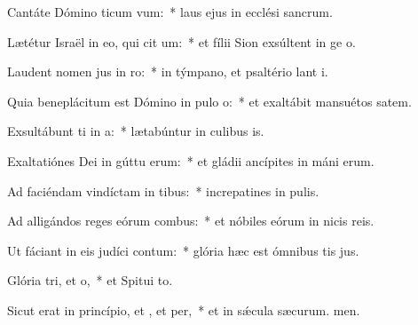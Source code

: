 \item Cantáte Dómino ticum vum:~* laus ejus in ecclési sancrum.
\item Lætétur Israël in eo, qui cit um:~* et fílii Sion exsúltent in ge o.
\item Laudent nomen jus in ro:~* in týmpano, et psaltério lant i.
\item Quia beneplácitum est Dómino in pulo o:~* et exaltábit mansuétos  satem.
\item Exsultábunt ti in a:~* lætabúntur in culibus is.
\item Exaltatiónes Dei in gúttu erum:~* et gládii ancípites in máni erum.
\item Ad faciéndam vindíctam in tibus:~* increpatines in pulis.
\item Ad alligándos reges eórum  combus:~* et nóbiles eórum in nicis reis.
\item Ut fáciant in eis judíci contum:~* glória hæc est ómnibus tis jus.
\item Glória tri, et o,~* et Spitui to.
\item Sicut erat in princípio, et , et per,~* et in sǽcula sæcurum. men.
